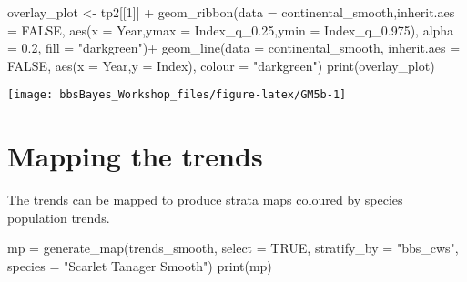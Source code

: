 \documentclass[
]{book}
\newenvironment{Shaded}{\begin{snugshade}}{\end{snugshade}}
\newcommand{\AttributeTok}[1]{\textcolor[rgb]{0.77,0.63,0.00}{#1}}
\newcommand{\ConstantTok}[1]{\textcolor[rgb]{0.00,0.00,0.00}{#1}}
\newcommand{\DecValTok}[1]{\textcolor[rgb]{0.00,0.00,0.81}{#1}}
\newcommand{\FloatTok}[1]{\textcolor[rgb]{0.00,0.00,0.81}{#1}}
\newcommand{\FunctionTok}[1]{\textcolor[rgb]{0.00,0.00,0.00}{#1}}
\newcommand{\NormalTok}[1]{#1}
\newcommand{\OtherTok}[1]{\textcolor[rgb]{0.56,0.35,0.01}{#1}}
\newcommand{\SpecialCharTok}[1]{\textcolor[rgb]{0.00,0.00,0.00}{#1}}
\newcommand{\StringTok}[1]{\textcolor[rgb]{0.31,0.60,0.02}{#1}}
\begin{document}
\begin{Shaded}
\begin{Highlighting}[]

\NormalTok{overlay\_plot }\OtherTok{\textless{}{-}}\NormalTok{ tp2[[}\DecValTok{1}\NormalTok{]] }\SpecialCharTok{+}
  \FunctionTok{geom\_ribbon}\NormalTok{(}\AttributeTok{data =}\NormalTok{ continental\_smooth,}\AttributeTok{inherit.aes =} \ConstantTok{FALSE}\NormalTok{,}
              \FunctionTok{aes}\NormalTok{(}\AttributeTok{x =}\NormalTok{ Year,}\AttributeTok{ymax =}\NormalTok{ Index\_q\_0}\FloatTok{.25}\NormalTok{,}\AttributeTok{ymin =}\NormalTok{ Index\_q\_0}\FloatTok{.975}\NormalTok{),}
              \AttributeTok{alpha =} \FloatTok{0.2}\NormalTok{,}
              \AttributeTok{fill =} \StringTok{"darkgreen"}\NormalTok{)}\SpecialCharTok{+}
  \FunctionTok{geom\_line}\NormalTok{(}\AttributeTok{data =}\NormalTok{ continental\_smooth, }\AttributeTok{inherit.aes =} \ConstantTok{FALSE}\NormalTok{,}
            \FunctionTok{aes}\NormalTok{(}\AttributeTok{x =}\NormalTok{ Year,}\AttributeTok{y =}\NormalTok{ Index),}
            \AttributeTok{colour =} \StringTok{"darkgreen"}\NormalTok{)}
\FunctionTok{print}\NormalTok{(overlay\_plot)}
\end{Highlighting}
\end{Shaded}

\begin{center}\texttt{[image: bbsBayes\_Workshop\_files/figure-latex/GM5b-1]} \end{center}

\hypertarget{mapping-the-trends}{%
\section{Mapping the trends}\label{mapping-the-trends}}

The trends can be mapped to produce strata maps coloured by species population trends.

\begin{Shaded}
\begin{Highlighting}[]
\NormalTok{mp }\OtherTok{=} \FunctionTok{generate\_map}\NormalTok{(trends\_smooth,}
                  \AttributeTok{select =} \ConstantTok{TRUE}\NormalTok{,}
                  \AttributeTok{stratify\_by =} \StringTok{"bbs\_cws"}\NormalTok{,}
                  \AttributeTok{species =} \StringTok{"Scarlet Tanager Smooth"}\NormalTok{)}
\FunctionTok{print}\NormalTok{(mp)}
\end{Highlighting}
\end{Shaded}
\end{document}
